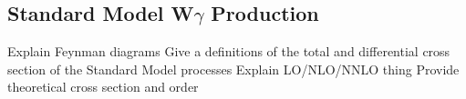 \subsection{Standard Model W$\gamma$ Production}
Explain Feynman diagrams
Give a definitions of the total and differential cross section of the Standard Model processes
Explain LO/NLO/NNLO thing
Provide theoretical cross section and order
